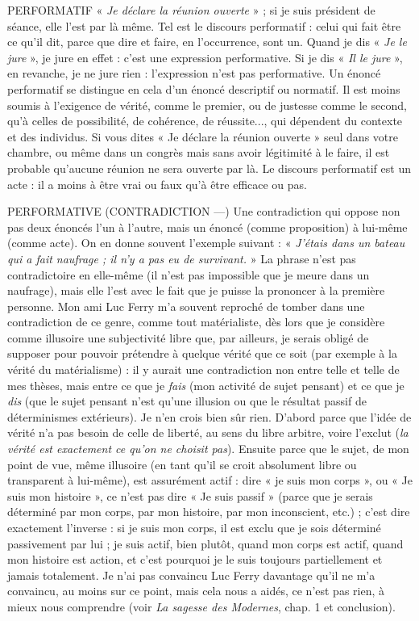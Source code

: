 PERFORMATIF  « {\it Je déclare la réunion ouverte} » ; si je suis président de séance,
elle l’est par là même. Tel est le discours performatif : celui
qui fait être ce qu’il dit, parce que dire et faire, en l’occurrence, sont un. Quand
je dis « {\it Je le jure} », je jure en effet : c'est une expression performative. Si je dis
« {\it Il le jure} », en revanche, je ne jure rien : l'expression n’est pas performative.
Un énoncé performatif se distingue en cela d’un énoncé descriptif ou normatif.
Il est moins soumis à l’exigence de vérité, comme le premier, ou de justesse
comme le second, qu’à celles de possibilité, de cohérence, de réussite..., qui
dépendent du contexte et des individus. Si vous dites « Je déclare la réunion
ouverte » seul dans votre chambre, ou même dans un congrès mais sans avoir
légitimité à le faire, il est probable qu'aucune réunion ne sera ouverte par là. Le
discours performatif est un acte : il a moins à être vrai ou faux qu’à être efficace
ou pas.

PERFORMATIVE (CONTRADICTION —) Une contradiction qui oppose
non pas deux énoncés l’un à
l’autre, mais un énoncé (comme proposition) à lui-même (comme acte). On en
donne souvent l'exemple suivant : « {\it J'étais dans un bateau qui a fait naufrage ;
il n'y a pas eu de survivant.} » La phrase n’est pas contradictoire en elle-même (il
n’est pas impossible que je meure dans un naufrage), mais elle l’est avec le fait
que je puisse la prononcer à la première personne. Mon ami Luc Ferry m’a souvent
reproché de tomber dans une contradiction de ce genre, comme tout
matérialiste, dès lors que je considère comme illusoire une subjectivité libre
que, par ailleurs, je serais obligé de supposer pour pouvoir prétendre à quelque
vérité que ce soit (par exemple à la vérité du matérialisme) : il y aurait une
contradiction non entre telle et telle de mes thèses, mais entre ce que je {\it fais}
(mon activité de sujet pensant) et ce que je {\it dis} (que le sujet pensant n’est
qu'une illusion ou que le résultat passif de déterminismes extérieurs). Je n’en
crois bien sûr rien. D'abord parce que l’idée de vérité n’a pas besoin de celle de
liberté, au sens du libre arbitre, voire l’exclut ({\it la vérité est exactement ce qu'on
ne choisit pas}). Ensuite parce que le sujet, de mon point de vue, même illusoire
(en tant qu’il se croit absolument libre ou transparent à lui-même), est assurément
actif : dire « je suis mon corps », ou « Je suis mon histoire », ce n’est pas
dire « Je suis passif » (parce que je serais déterminé par mon corps, par mon histoire,
par mon inconscient, etc.) ; c’est dire exactement l’inverse : si je suis mon
corps, il est exclu que je sois déterminé passivement par lui ; je suis actif, bien
plutôt, quand mon corps est actif, quand mon histoire est action, et c’est pourquoi
je le suis toujours partiellement et jamais totalement. Je n’ai pas convaincu
Luc Ferry davantage qu’il ne m’a convaincu, au moins sur ce point, mais cela
nous a aidés, ce n’est pas rien, à mieux nous comprendre (voir {\it La sagesse des
Modernes}, chap. 1 et conclusion).

